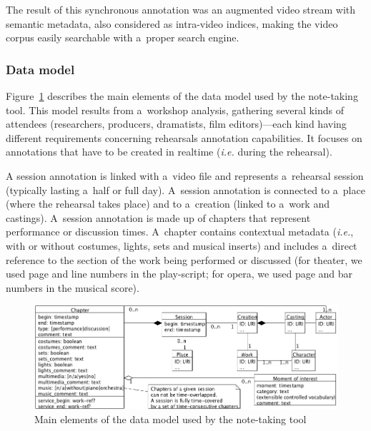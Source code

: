 \documentclass[conference]{IEEEtran}
\newcommand{\todo}[1]{\noindent\textcolor{red}{{\bf \{ToDo} #1{\bf \}}}}
\begin{document}
The result of this synchronous annotation was an augmented  video stream with semantic metadata, also considered as intra-video indices, making the video corpus easily searchable with a~proper search engine.

\subsubsection{Data model} Figure~\ref{fig_data_model} describes the main elements of the data model used by the note-taking tool. This model results from a~workshop analysis, gathering several kinds of attendees (researchers, producers, dramatists, film editors)---each kind having different requirements concerning rehearsals annotation capabilities. It focuses on annotations that have to be created in realtime (\emph{i.e.} during the rehearsal). \newline

A session annotation is linked with a~video file and represents a~rehearsal session (typically lasting a~half or full day). A~session annotation is connected to a~place (where the rehearsal takes place) and to a~creation (linked to a~work and castings). A~session annotation is made up of chapters that represent performance or discussion times. A~chapter contains contextual metadata (\emph{i.e.}, with or without costumes, lights, sets and musical inserts) and includes a~direct reference to the section of the work being performed or discussed (for theater, we used page and line numbers in the play-script; for opera, we used page and bar numbers in the musical score). 



\begin{figure}[ht]
\centering
{
\includegraphics[width=0.8\linewidth]{UMLet_Data_modelvFullPage}
\caption{Main elements of the data model used by the note-taking tool}
\label{fig_data_model}
}
\end{figure}
\end{document}

